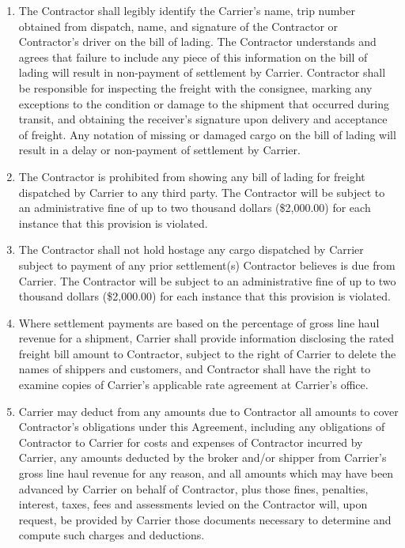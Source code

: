 {\begin{enumerate}[ 
        ref = \SecondLevelEnumerator
    ]
        \item The Contractor shall legibly identify the Carrier's name,
        trip number obtained from dispatch, name, and signature of the
        Contractor or Contractor's driver on the bill of lading. The
        Contractor understands and agrees that failure to include any piece
        of this information on the bill of lading will result in
        non-payment of settlement by Carrier. Contractor shall be
        responsible for inspecting the freight with the consignee, marking
        any exceptions to the condition or damage to the shipment that
        occurred during transit, and obtaining the receiver's signature
        upon delivery and acceptance of freight. Any notation of missing or
        damaged cargo on the bill of lading will result in a delay or
        non-payment of settlement by Carrier.

        \item The Contractor is prohibited from showing any bill of lading
        for freight dispatched by Carrier to any third party. The
        Contractor will be subject to an administrative fine of up to two
        thousand dollars (\$2,000.00) for each instance that this provision
        is violated.

        \item The Contractor shall not hold hostage any cargo dispatched by
        Carrier subject to payment of any prior settlement(s) Contractor
        believes is due from Carrier. The Contractor will be subject to an
        administrative fine of up to two thousand dollars (\$2,000.00) for
        each instance that this provision is violated.

        \item Where settlement payments are based on the percentage of
        gross line haul revenue for a shipment, Carrier shall provide
        information disclosing the rated freight bill amount to Contractor,
        subject to the right of Carrier to delete the names of shippers and
        customers, and Contractor shall have the right to examine copies of
        Carrier's applicable rate agreement at Carrier's office.

        \item Carrier may deduct from any amounts due to Contractor all
        amounts to cover Contractor's obligations under this Agreement,
        including any obligations of Contractor to Carrier for costs and
        expenses of Contractor incurred by Carrier, any amounts deducted by
        the broker and/or shipper from Carrier's gross line haul revenue
        for any reason, and all amounts which may have been advanced by
        Carrier on behalf of Contractor, plus those fines, penalties,
        interest, taxes, fees and assessments levied on the Contractor
        will, upon request, be provided by Carrier those documents
        necessary to determine and compute such charges and deductions.
    \end{enumerate}
}